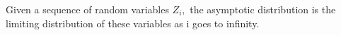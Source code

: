 Given a sequence of random variables $Z_{i},$  the asymptotic distribution
is the limiting distribution of these variables as i goes to infinity.
